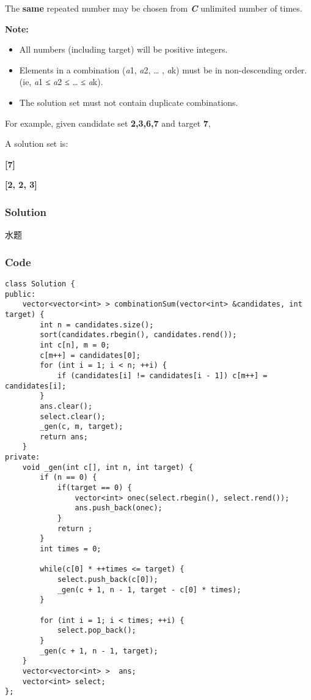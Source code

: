\documentclass[courier]{article}
\begin{document}
\begin{CJK*}{UTF8}{gkai}
The \textbf{same} repeated number may be chosen from \textbf{\emph{C}} unlimited number of times.

\textbf{Note:}



\begin{itemize}
\item All numbers (including target) will be positive integers.
\item Elements in a combination (\emph{a}1, \emph{a}2, … , \emph{a}k) must be in non-descending order. (ie, \emph{a}1 ≤ \emph{a}2 ≤ … ≤ \emph{a}k).
\item The solution set must not contain duplicate combinations.
\end{itemize}

For example, given candidate set \textbf{2,3,6,7} and target \textbf{7}, 


A solution set is: 


\textbf{[7]} 


\textbf{[2, 2, 3]}



\subsubsection*{Solution}
水题

\subsubsection*{Code}
\begin{lstlisting}
class Solution {
public:
    vector<vector<int> > combinationSum(vector<int> &candidates, int target) {
        int n = candidates.size();
        sort(candidates.rbegin(), candidates.rend());
        int c[n], m = 0;
        c[m++] = candidates[0];
        for (int i = 1; i < n; ++i) {
            if (candidates[i] != candidates[i - 1]) c[m++] = candidates[i];
        }
        ans.clear();
        select.clear();
        _gen(c, m, target);
        return ans;
    }
private:
    void _gen(int c[], int n, int target) {
        if (n == 0) {
            if(target == 0) {
                vector<int> onec(select.rbegin(), select.rend());
                ans.push_back(onec);
            }
            return ;
        }
        int times = 0;
        
        while(c[0] * ++times <= target) {
            select.push_back(c[0]);
            _gen(c + 1, n - 1, target - c[0] * times);
        }
        
        for (int i = 1; i < times; ++i) {
            select.pop_back();
        }
        _gen(c + 1, n - 1, target);
    }
    vector<vector<int> >  ans;
    vector<int> select;
};


\end{lstlisting}
\end{CJK*}
\end{document}
